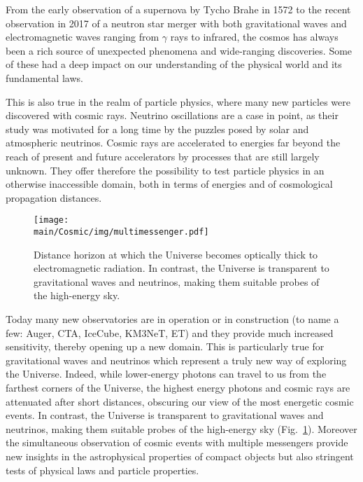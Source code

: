\documentclass[../report.tex]{subfiles}
\providecommand{\main}{..}
\begin{document}
\linenumbers



From the early observation of a supernova by Tycho Brahe in 1572 to the recent observation in 2017 of a neutron star merger with both gravitational waves and electromagnetic waves ranging from $\gamma$ rays to infrared, the cosmos has always been a rich source of unexpected phenomena and wide-ranging discoveries. Some of these had a deep impact on our understanding of the physical world and its fundamental laws.

This is also true in the realm of particle physics, where many new particles were discovered with cosmic rays. Neutrino oscillations are a case in point, as their study was motivated for a long time by the puzzles posed by solar and atmospheric neutrinos. Cosmic rays are accelerated to energies far beyond the reach of present and future accelerators by processes that are still largely unknown. They offer therefore the possibility to test particle physics in an otherwise inaccessible domain, both in terms of energies and of cosmological propagation distances.

\begin{figure} [htbp!]
\begin{center}
\texttt{[image: \\main/Cosmic/img/multimessenger.pdf]}
\caption{\label{fig:multimessenger} Distance horizon at which the Universe becomes optically thick to electromagnetic radiation.%
In contrast, the Universe is transparent to gravitational waves and neutrinos, making them suitable probes of the high-energy sky.
}
\end{center}
\end{figure}
Today many new observatories are in operation or in construction (to name a few: Auger, CTA, IceCube, KM3NeT, ET) and they provide much increased sensitivity, thereby opening up a new domain. This is particularly true for gravitational waves and neutrinos which represent a truly new way of exploring the Universe. Indeed, while lower-energy photons can travel to us from the farthest corners of the Universe, the highest energy photons and cosmic rays are attenuated after short distances, obscuring our view of the most energetic cosmic events. In contrast, the Universe is transparent to gravitational waves and neutrinos, making them suitable probes of the high-energy sky (Fig.~\ref{fig:multimessenger}).
Moreover the simultaneous observation of cosmic events with multiple messengers 
provide new insights in the astrophysical properties of compact objects but also stringent tests of physical laws and particle properties.
\end{document}
